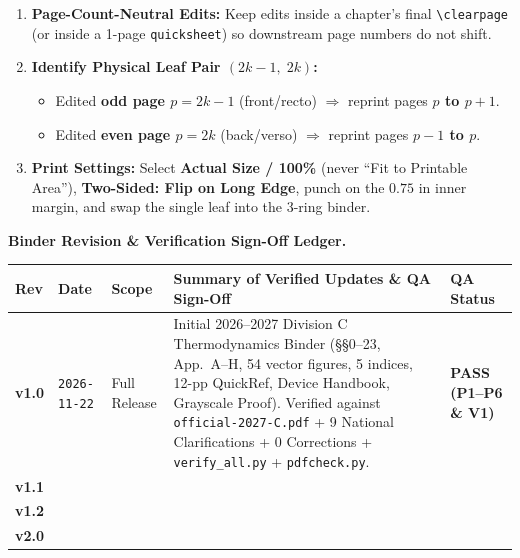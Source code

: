 \begin{twocol}[0.49]
\begin{formulacard}
\begin{enumerate}
  \item \textbf{Page-Count-Neutral Edits:} Keep edits inside a chapter's final \texttt{\textbackslash clearpage} (or inside a 1-page \texttt{quicksheet}) so downstream page numbers do not shift.
  \item \textbf{Identify Physical Leaf Pair $(2k-1,\; 2k)$:}
    \begin{itemize}
      \item Edited \textbf{odd page $p=2k-1$} (front/recto) $\Rightarrow$ reprint pages \textbf{$p$ to $p+1$}.
      \item Edited \textbf{even page $p=2k$} (back/verso) $\Rightarrow$ reprint pages \textbf{$p-1$ to $p$}.
    \end{itemize}
  \item \textbf{Print Settings:} Select \textbf{Actual Size / 100\%} (never ``Fit to Printable Area''), \textbf{Two-Sided: Flip on Long Edge}, punch on the $0.75\text{ in}$ inner margin, and swap the single leaf into the 3-ring binder.
\end{enumerate}
\end{formulacard}
\end{twocol}

\par\noindent\textbf{Binder Revision \& Verification Sign-Off Ledger.}
\par\smallskip\noindent
{\scriptsize\setlength{\tabcolsep}{3pt}\renewcommand{\arraystretch}{1.12}
\begin{tabularx}{\linewidth}{@{}l l l >{\raggedright\arraybackslash}X l@{}}
\toprule
\textbf{Rev} & \textbf{Date} & \textbf{Scope} & \textbf{Summary of Verified Updates \& QA Sign-Off} & \textbf{QA Status} \\
\midrule
\textbf{v1.0} & \texttt{2026-11-22} & Full Release & Initial 2026--2027 Division C Thermodynamics Binder (\S\S 0--23, App.\ A--H, 54 vector figures, 5 indices, 12-pp QuickRef, Device Handbook, Grayscale Proof). Verified against \texttt{official-2027-C.pdf} + 9 National Clarifications + 0 Corrections + \texttt{verify\_all.py} + \texttt{pdfcheck.py}. & \textbf{PASS (P1--P6 \& V1)} \\
\rowcolor{rowalt}\textbf{v1.1} & \dotfill & \dotfill & \dotfill & \dotfill \\
\textbf{v1.2} & \dotfill & \dotfill & \dotfill & \dotfill \\
\rowcolor{rowalt}\textbf{v2.0} & \dotfill & \dotfill & \dotfill & \dotfill \\
\bottomrule
\end{tabularx}}
